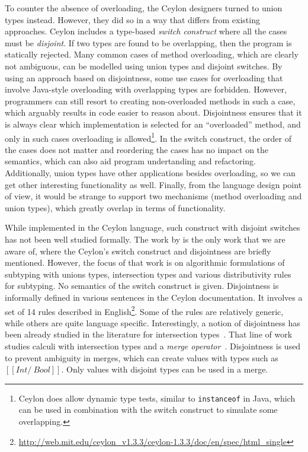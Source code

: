 To counter the absence of overloading, the Ceylon designers turned to
union types instead. However, they did so in a way that differs from
existing approaches. Ceylon includes a type-based 
\emph{switch construct} where all the cases must be \emph{disjoint}.  If
two types are found to be overlapping, then the program is statically
rejected. Many common cases of method overloading, which are clearly
not ambiguous, can be modelled using union types and disjoint switches.
By using an approach based on disjointness, some use cases for
overloading that involve Java-style overloading with
overlapping types are forbidden. However,
programmers can still resort to creating non-overloaded methods in
such a case, which arguably results in code easier to reason about.
Disjointness ensures that it is always
clear which implementation is selected for an ``overloaded'' method,
and only in such cases overloading is allowed\footnote{Ceylon does
  allow dynamic type tests, similar to \lstinline{instanceof} in Java, which can be used
  in combination with the switch construct to simulate some overlapping.}.
In the switch construct,
the order of the cases does not matter and reordering the cases has no
impact on the semantics, which can also aid program undertanding and
refactoring.
Additionally, union types have other applications besides overloading,
so we can get other interesting functionality as well. Finally, from
the language design point of view, it would be strange to support two
mechanisms (method overloading and union types), which greatly overlap
in terms of functionality.

While implemented in the Ceylon language, such construct
with disjoint switches has not been well studied formally.
The work by \citet{muehlboeck2018empowering} is the only work that we are aware of,
where the Ceylon's switch construct
and disjointness are briefly mentioned. However, the focus 
of that work is on algorithmic formulations of subtyping
with unions types, intersection types and various distributivity
rules for subtyping. No semantics of the switch construct is given.
Disjointness is informally defined in various sentences in the
Ceylon documentation. It involves a set of 14 rules described in English\footnote{\url{http://web.mit.edu/ceylon_v1.3.3/ceylon-1.3.3/doc/en/spec/html_single}}. Some of the rules are relatively generic, while
others are quite language specific. 
Interestingly, a notion
of disjointness has been already studied in the literature
for intersection types~\cite{oliveira2016disjoint}. That line of work studies calculi
with intersection types and a \textit{merge operator}~\cite{reynolds1988preliminary}. Disjointness
is used to prevent ambiguity in merges, which can create
values with types such as $[[Int /\ Bool]]$. Only values
with disjoint types can be used in a merge.


